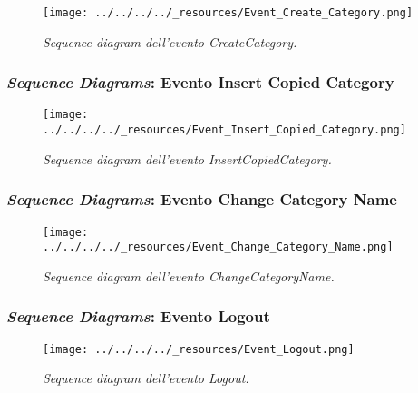 \begin{figure}
\centering
\texttt{[image: ../../../../\_resources/Event\_Create\_Category.png]}
\caption{\emph{Sequence diagram dell'evento CreateCategory.}}
\end{figure}

\pagebreak

\hypertarget{sequence-diagrams-evento-insert-copied-category}{%
\subsubsection{\texorpdfstring{\emph{Sequence Diagrams}: Evento Insert
Copied
Category}{Sequence Diagrams: Evento Insert Copied Category}}\label{sequence-diagrams-evento-insert-copied-category}}

\begin{figure}
\centering
\texttt{[image: ../../../../\_resources/Event\_Insert\_Copied\_Category.png]}
\caption{\emph{Sequence diagram dell'evento InsertCopiedCategory.}}
\end{figure}

\pagebreak

\hypertarget{sequence-diagrams-evento-change-category-name}{%
\subsubsection{\texorpdfstring{\emph{Sequence Diagrams}: Evento Change
Category
Name}{Sequence Diagrams: Evento Change Category Name}}\label{sequence-diagrams-evento-change-category-name}}

\begin{figure}
\centering
\texttt{[image: ../../../../\_resources/Event\_Change\_Category\_Name.png]}
\caption{\emph{Sequence diagram dell'evento ChangeCategoryName.}}
\end{figure}

\pagebreak

\hypertarget{sequence-diagrams-evento-logout-1}{%
\subsubsection{\texorpdfstring{\emph{Sequence Diagrams}: Evento
Logout}{Sequence Diagrams: Evento Logout}}\label{sequence-diagrams-evento-logout-1}}

\begin{figure}
\centering
\texttt{[image: ../../../../\_resources/Event\_Logout.png]}
\caption{\emph{Sequence diagram dell'evento Logout.}}
\end{figure}
